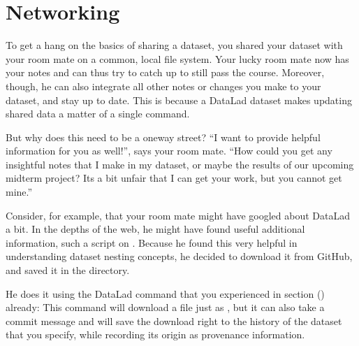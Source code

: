 \section{Networking}
\label{\detokenize{basics/101-121-siblings:networking}}\label{\detokenize{basics/101-121-siblings:sibling}}\label{\detokenize{basics/101-121-siblings:index-0}}\label{\detokenize{basics/101-121-siblings::doc}}
\sphinxAtStartPar
To get a hang on the basics of sharing a dataset,
you shared your  dataset with your
room mate on a common, local file system. Your lucky
room mate now has your notes and can thus try to catch
up to still pass the course.
Moreover, though, he can also integrate all other notes
or changes you make to your dataset, and stay up to date.
This is because a DataLad dataset makes updating shared
data a matter of a single  command.

\sphinxAtStartPar
But why does this need to be a one\sphinxhyphen{}way street? “I want to
provide helpful information for you as well!”, says your
room mate. “How could you get any insightful notes that
I make in my dataset, or maybe the results of our upcoming
mid\sphinxhyphen{}term project? Its a bit unfair that I can get your work,
but you cannot get mine.”

\ignorespaces 
\sphinxAtStartPar
Consider, for example, that your room mate might have googled about DataLad
a bit. In the depths of the web, he might have found useful additional information, such
a script on .
Because he found this very helpful in understanding dataset
nesting concepts, he decided to download it from GitHub, and saved it in the  directory.

\sphinxAtStartPar
He does it using the DataLad command 
that you experienced in section {\hyperref[\detokenize{basics/101-101-create:createds}]{}} () already: This command will
download a file just as , but it can also take a commit message
and will save the download right to the history of the dataset that you specify,
while recording its origin as provenance information.

